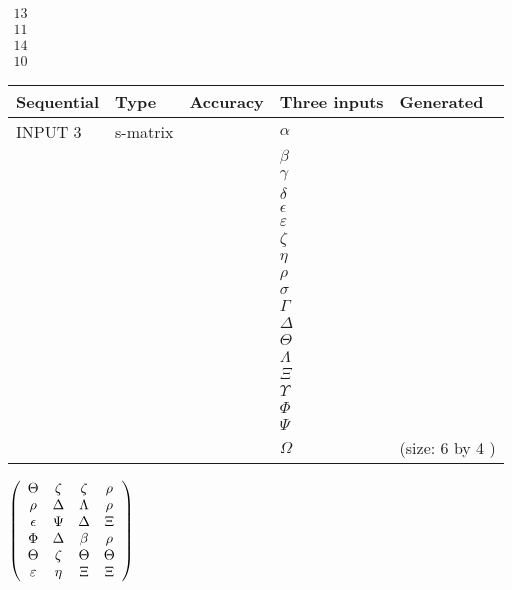 \documentclass[12pt]{article}
\begin{document}
   
 $\begin{array}{
 c
 }
          13  \\ 
          11  \\ 
          14  \\ 
          10
\end{array}  $ 
  
  
\noindent\begin{tabular}{|l|l|l|l|l|}
\hline
 Sequential & Type & Accuracy & Three inputs & Generated \\ 
\hline
 
 
  INPUT $            3 $ & s-matrix & & 
 $  \alpha $ & 
  \\
  & & & 
 $  \beta $ & 
  \\
  & & & 
 $  \gamma $ & 
  \\
  & & & 
 $  \delta $ & 
  \\
  & & & 
 $  \epsilon $ & 
  \\
  & & & 
 $  \varepsilon $ & 
  \\
  & & & 
 $                     \zeta $ & 
  \\
  & & & 
 $  \eta $ & 
  \\
  & & & 
 $  \rho $ & 
  \\
  & & & 
 $  \sigma $ & 
  \\
  & & & 
 $  \Gamma $ & 
  \\
  & & & 
 $  \Delta $ & 
  \\
  & & & 
 $  \Theta $ & 
  \\
  & & & 
 $  \Lambda $ & 
  \\
  & & & 
 $                     \Xi $ & 
  \\
  & & & 
 $  \Upsilon $ & 
  \\
  & & & 
 $  \Phi $ & 
  \\
  & & & 
 $  \Psi $ & 
  \\
  & & & 
 $  \Omega $ & 
  (size:            6  by            4 )
 \\  \hline  
 \end{tabular}
   
   
 $  \left( \begin{array}
 {
 c
 c
 c
 c
 }
 \Theta & 
                    \zeta & 
                    \zeta & 
 \rho \\ 
 \rho & 
 \Delta & 
 \Lambda & 
 \rho \\ 
 \epsilon & 
 \Psi & 
 \Delta & 
                    \Xi \\ 
 \Phi & 
 \Delta & 
 \beta & 
 \rho \\ 
 \Theta & 
                    \zeta & 
 \Theta & 
 \Theta \\ 
 \varepsilon & 
 \eta & 
                    \Xi & 
                    \Xi
 \end{array} \right) $ 
  
\end{document}
